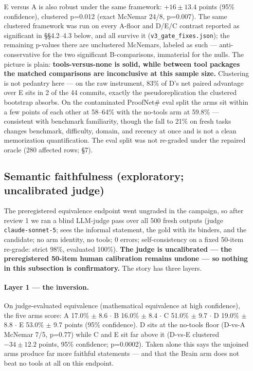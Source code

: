 \documentclass[10pt]{article}
\newcommand{\code}[1]{\texttt{#1}}
\begin{document}
E versus A is also robust under the same framework: $+16 \pm 13.4$
points (95\% confidence), clustered p=0.012 (exact McNemar 24/8, p=0.007). The
same clustered framework was run on every A-floor and D/E/C contrast
reported as significant in \S\S 4.2--4.3 below, and all survive it
(\code{v3\_gate\_fixes.json}); the remaining p-values there are
unclustered McNemars, labeled as such --- anti-conservative for the two
significant B-comparisons, immaterial for the nulls. The picture is
plain: \textbf{tools-versus-none is solid, while between tool packages
the matched comparisons are inconclusive at this sample size.}
Clustering is not pedantry here --- on the raw instrument, 83\% of D's
net paired advantage over E sits in 2 of the 44 commits, exactly the
pseudoreplication the clustered bootstrap absorbs. On the contaminated
ProofNet\# eval split the arms sit within a few points of each other at
58--64\% with the no-tools arm at 59.8\% --- consistent with benchmark
familiarity, though the fall to 21\% on fresh tasks changes benchmark,
difficulty, domain, and recency at once and is not a clean memorization
quantification. The eval split was not re-graded under the repaired
oracle (280 affected rows; \S 7).

\subsection{Semantic faithfulness (exploratory; uncalibrated judge)}
\label{sec:judge}

The preregistered equivalence endpoint went ungraded in the campaign, so
after review 1 we ran a blind LLM-judge pass over all 500 fresh outputs
(judge \code{claude-sonnet-5}; sees the informal statement, the gold
with its binders, and the candidate; no arm identity, no tools; 0
errors; self-consistency on a fixed 50-item re-grade: strict 98\%,
evaluated 100\%). \textbf{The judge is uncalibrated --- the
preregistered 50-item human calibration remains undone --- so nothing in
this subsection is confirmatory.} The story has three layers.

\paragraph{Layer 1 --- the inversion.} On judge-evaluated equivalence
(mathematical equivalence at high confidence), the five arms score:
A 17.0\% $\pm$ 8.6 $\cdot$ B 16.0\% $\pm$ 8.4 $\cdot$
C 51.0\% $\pm$ 9.7 $\cdot$ D 19.0\% $\pm$ 8.8 $\cdot$
E 53.0\% $\pm$ 9.7 points (95\% confidence). D sits at the no-tools
floor (D-vs-A McNemar 7/5, p=0.77) while C and E sit far above it
(D-vs-E clustered $-34 \pm 12.2$ points, 95\% confidence;
p=0.0002). Taken alone this says the unjoined arms
produce far more faithful statements --- and that the Brain arm does not
beat no tools at all on this endpoint.
\end{document}

